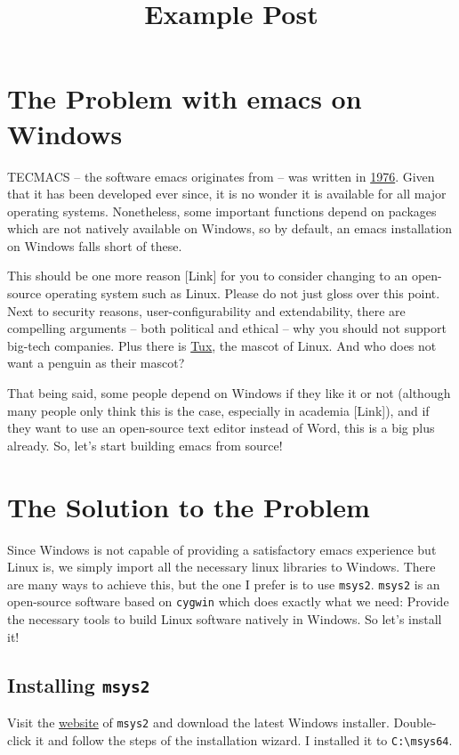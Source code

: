 \documentclass[a4paper, fontsize=11pt, headings=optiontohead, headsepline=true, twoside=false]{scrartcl}
\date{}
\title{Example Post}
\begin{document}
\maketitle
\tableofcontents

\setcounter{tocdepth}{2}
\tableofcontents
\section{The Problem with emacs on Windows}
\label{sec:org4ad4f5d}
TECMACS -- the software emacs originates from -- was written in
\href{https://www.jwz.org/doc/emacs-timeline.html}{1976}. Given that it has been developed ever since, it is no wonder it
is available for all major operating systems. Nonetheless, some
important functions depend on packages which are not natively
available on Windows, so by default, an emacs installation on Windows
falls short of these.

This should be one more reason [Link] for you to consider changing to
an open-source operating system such as Linux. Please do not just
gloss over this point. Next to security reasons, user-configurability
and extendability, there are compelling arguments -- both
political and ethical -- why you should not support big-tech
companies. Plus there is \href{https://en.wikipedia.org/wiki/Tux\_(mascot)}{Tux}, the mascot of Linux. And who does not
want a penguin as their mascot?

That being said, some people depend on Windows if they like it or not
(although many people only think this is the case, especially in
academia [Link]), and if they want to use an open-source text editor
instead of Word, this is a big plus already. So, let's start building
emacs from source!

\section{The Solution to the Problem}
\label{sec:orge8f7c65}
Since Windows is not capable of providing a satisfactory emacs
experience but Linux is, we simply import all the necessary linux
libraries to Windows. There are many ways to achieve this, but the one
I prefer is to use \texttt{msys2}. \texttt{msys2} is an open-source software based
on \texttt{cygwin} which does exactly what we need: Provide the necessary tools
to build Linux software natively in Windows. So let's install it!
\subsection{Installing \texttt{msys2}}
\label{sec:org274ce90}
Visit the \href{https://www.msys2.org/}{website} of \texttt{msys2} and download the latest Windows
installer. Double-click it and follow the steps of the installation
wizard. I installed it to \texttt{C:\textbackslash{}msys64}. 
\end{document}
